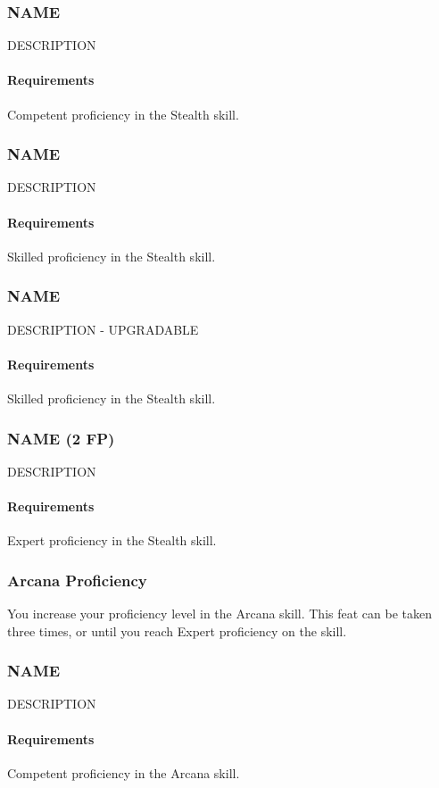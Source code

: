\subsubsection{NAME} \label{feat::name}
    DESCRIPTION
    \paragraph{Requirements} Competent proficiency in the Stealth skill.
\subsubsection{NAME} \label{feat::name}
    DESCRIPTION
    \paragraph{Requirements} Skilled proficiency in the Stealth skill.
\subsubsection{NAME} \label{feat::name}
    DESCRIPTION - UPGRADABLE
    \paragraph{Requirements} Skilled proficiency in the Stealth skill.
\subsubsection{NAME (2 FP)} \label{feat::name}
    DESCRIPTION
    \paragraph{Requirements} Expert proficiency in the Stealth skill.
\subsubsection{Arcana Proficiency} \label{feat::arcanaprof}
    You increase your proficiency level in the Arcana skill.
    This feat can be taken three times, or until you reach Expert proficiency on the skill.
\subsubsection{NAME} \label{feat::name}
    DESCRIPTION
    \paragraph{Requirements} Competent proficiency in the Arcana skill.
